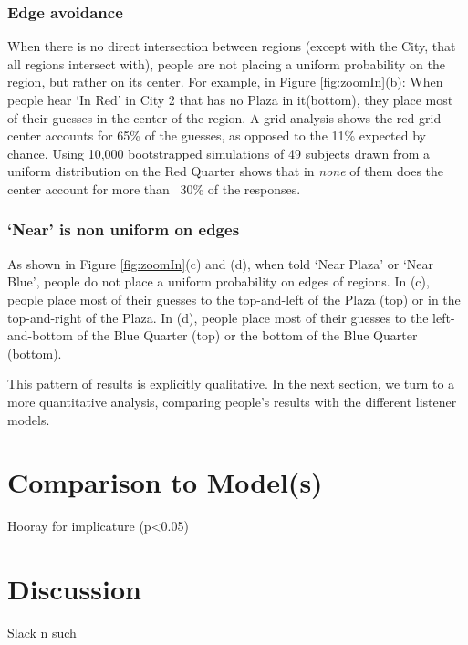 \documentclass[10pt,letterpaper]{article}
\begin{document}
\subsubsection{Edge avoidance} When there is no direct intersection between regions (except with the City, that all regions intersect with), people are not placing a uniform probability on the region, but rather on its center. For example, in Figure \ref{fig:zoomIn}(b): When people hear `In Red' in City 2 that has no Plaza in it(bottom), they place most of their guesses in the center of the region. A grid-analysis shows the red-grid center accounts for 65\% of the guesses, as opposed to the 11\% expected by chance. Using 10,000 bootstrapped simulations of 49 subjects drawn from a uniform distribution on the Red Quarter shows that in \textit{none} of them does the center account for more than ~30\% of the responses. 

\subsubsection{`Near' is non uniform on edges} As shown in Figure \ref{fig:zoomIn}(c) and (d), when told `Near Plaza' or `Near Blue', people do not place a uniform probability on edges of regions. In (c), people place most of their guesses to the top-and-left of the Plaza (top) or in the top-and-right of the Plaza. In (d), people place most of their guesses to the left-and-bottom of the Blue Quarter (top) or the bottom of the Blue Quarter (bottom). 

This pattern of results is explicitly qualitative. In the next section, we turn to a more quantitative analysis, comparing people's results with the different listener models. 

\section{Comparison to Model(s)}

Hooray for implicature (p<0.05)

\section{Discussion}

Slack n such





\setlength{\bibleftmargin}{.125in}
\setlength{\bibindent}{-\bibleftmargin}

\end{document}
